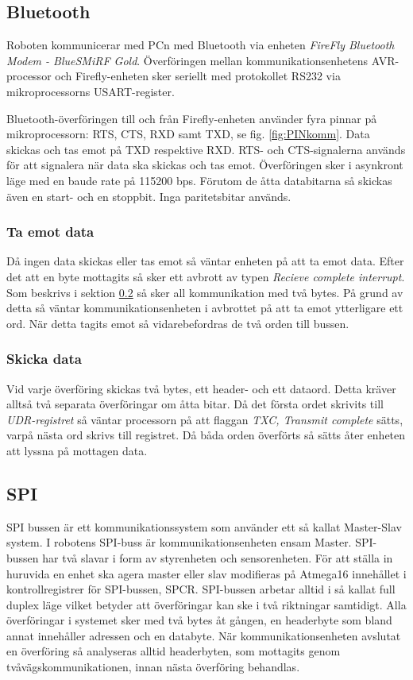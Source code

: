 \subsection{Bluetooth}
Roboten kommunicerar med PCn med Bluetooth via enheten \emph{FireFly Bluetooth Modem - BlueSMiRF Gold}. Överföringen mellan kommunikationsenhetens AVR-processor och Firefly-enheten sker seriellt med protokollet RS232 via mikroprocessorns USART-register. 

Bluetooth-överföringen till och från Firefly-enheten använder fyra pinnar på mikroprocessorn: RTS, CTS, RXD samt TXD, se fig. \ref{fig:PINkomm}. Data skickas och tas emot på TXD respektive RXD. RTS- och CTS-signalerna används för att signalera när data ska skickas och tas emot. Överföringen sker i asynkront läge med en baude rate på 115200 bps. Förutom de åtta databitarna så skickas även en start- och en stoppbit. Inga paritetsbitar används. 

\subsubsection*{Ta emot data}
Då ingen data skickas eller tas emot så väntar enheten på att ta emot data. Efter det att en byte mottagits så sker ett avbrott av typen \emph{Recieve complete interrupt}. Som beskrivs i sektion \ref{sec:SPI} så sker all kommunikation med två bytes. På grund av detta så väntar kommunikationsenheten i avbrottet på att ta emot ytterligare ett ord. När detta tagits emot så vidarebefordras de två orden till bussen. 

\subsubsection*{Skicka data}
Vid varje överföring skickas två bytes, ett header- och ett dataord. Detta kräver alltså två separata överföringar om åtta bitar. Då det första ordet skrivits till \emph{UDR-registret} så väntar processorn på att flaggan \emph{TXC, Transmit complete} sätts, varpå nästa ord skrivs till registret. Då båda orden överförts så sätts åter enheten att lyssna på mottagen data. 

\subsection{SPI}
\label{sec:SPI}
SPI bussen är ett kommunikationssystem som använder ett så kallat 
Master-Slav system. I robotens SPI-buss är kommunikationsenheten ensam Master.
SPI-bussen har två slavar i form av styrenheten och sensorenheten. För att 
ställa in huruvida en enhet ska agera master eller slav modifieras på Atmega16 
innehållet i kontrollregistrer för SPI-bussen, SPCR. SPI-bussen arbetar alltid 
i så kallat full duplex läge vilket betyder att överföringar kan ske i två 
riktningar samtidigt. Alla överföringar i systemet sker med två bytes åt 
gången, en headerbyte som bland annat innehåller adressen och en databyte. 
När kommunikationsenheten avslutat en överföring så analyseras alltid 
headerbyten, som mottagits genom tvåvägskommunikationen, innan nästa 
överföring behandlas.  


